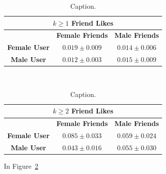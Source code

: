\begin{table}[t!]
\centering
\begin{tabular}{|c|c|c|} 
\multicolumn{3}{c}{\textbf{$k \geq 1$ Friend Likes}} \\ \hline
& \textbf{Female Friends} & \textbf{Male Friends} \\ \hline
\textbf{Female User} & $0.019 \pm 0.009$ & $0.014 \pm 0.006$ \\ \hline
\textbf{Male User}   & $0.012 \pm 0.003$ & $0.015 \pm 0.009$ \\ \hline
\end{tabular} $\qquad$
\begin{tabular}{|c|c|c|} 
\multicolumn{3}{c}{\textbf{$k \geq 2$ Friend Likes}} \\ \hline
& \textbf{Female Friends} & \textbf{Male Friends} \\ \hline
\textbf{Female User} & $0.085 \pm 0.033$ & $0.059 \pm 0.024$ \\ \hline
\textbf{Male User}   & $0.043 \pm 0.016$ & $0.055 \pm 0.030$ \\ \hline
\end{tabular}
\caption{Caption.}
\label{fig:res6}
\end{table}

In Figure~\ref{fig:res6}

